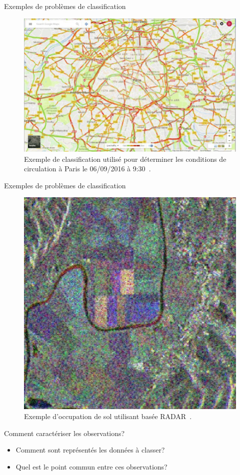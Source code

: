\documentclass[8pt]{beamer}
\begin{document}
		\begin{frame}{Exemples de problèmes de classification}
			\begin{figure}[H]
				\includegraphics[width=.65\textwidth]{images/samples/traffic_paris}
				\caption*{\tiny Exemple de classification utilisé pour déterminer les conditions de circulation à Paris le 06/09/2016 à 9:30~\cite{tutic2016google}.}
			\end{figure}
		\end{frame}

		\begin{frame}{Exemples de problèmes de classification}
			\begin{figure}[H]
				\includegraphics[width=.45\textwidth]{images/samples/radar}
				\caption*{\tiny Exemple d'occupation de sol utilisant basée RADAR~\cite{EsaRadar}.}
			\end{figure}
		\end{frame}

		\begin{frame}{Comment caractériser les observations?}
			\begin{itemize}
				\item<1-> Comment sont représentés les données à classer?
				\item<2-> Quel est le point commun entre ces observations?
			\end{itemize}
		\end{frame}
\end{document}
